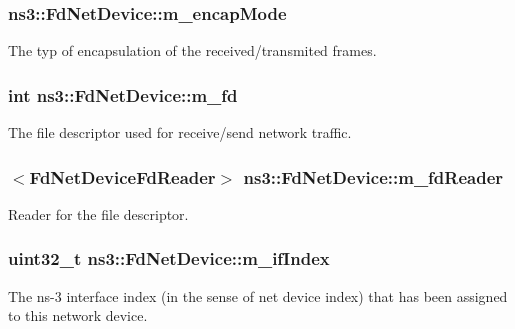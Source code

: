\subsubsection[{\texorpdfstring{m\+\_\+encap\+Mode}{m_encapMode}}]{ ns3\+::\+Fd\+Net\+Device\+::m\+\_\+encap\+Mode\hspace{0.3cm}{\ttfamily [private]}}\hypertarget{classns3_1_1FdNetDevice_aa5d97abfd57576f6b80423ac764e5cc8}{}\label{classns3_1_1FdNetDevice_aa5d97abfd57576f6b80423ac764e5cc8}
The typ of encapsulation of the received/transmited frames. 
\subsubsection[{\texorpdfstring{m\+\_\+fd}{m_fd}}]{\setlength{\rightskip}{0pt plus 5cm}int ns3\+::\+Fd\+Net\+Device\+::m\+\_\+fd\hspace{0.3cm}{\ttfamily [private]}}\hypertarget{classns3_1_1FdNetDevice_a2351bba8f2719557d98ff85e88b451a5}{}\label{classns3_1_1FdNetDevice_a2351bba8f2719557d98ff85e88b451a5}
The file descriptor used for receive/send network traffic. 
\subsubsection[{\texorpdfstring{m\+\_\+fd\+Reader}{m_fdReader}}]{$<${\bf Fd\+Net\+Device\+Fd\+Reader}$>$ ns3\+::\+Fd\+Net\+Device\+::m\+\_\+fd\+Reader\hspace{0.3cm}{\ttfamily [private]}}\hypertarget{classns3_1_1FdNetDevice_ac678c4f411e1982c5d2416f7c05ebd3b}{}\label{classns3_1_1FdNetDevice_ac678c4f411e1982c5d2416f7c05ebd3b}
Reader for the file descriptor. 
\subsubsection[{\texorpdfstring{m\+\_\+if\+Index}{m_ifIndex}}]{\setlength{\rightskip}{0pt plus 5cm}uint32\+\_\+t ns3\+::\+Fd\+Net\+Device\+::m\+\_\+if\+Index\hspace{0.3cm}{\ttfamily [private]}}\hypertarget{classns3_1_1FdNetDevice_a1b65e4f3e463c7ae49267e26213a6392}{}\label{classns3_1_1FdNetDevice_a1b65e4f3e463c7ae49267e26213a6392}
The ns-\/3 interface index (in the sense of net device index) that has been assigned to this network device. 
